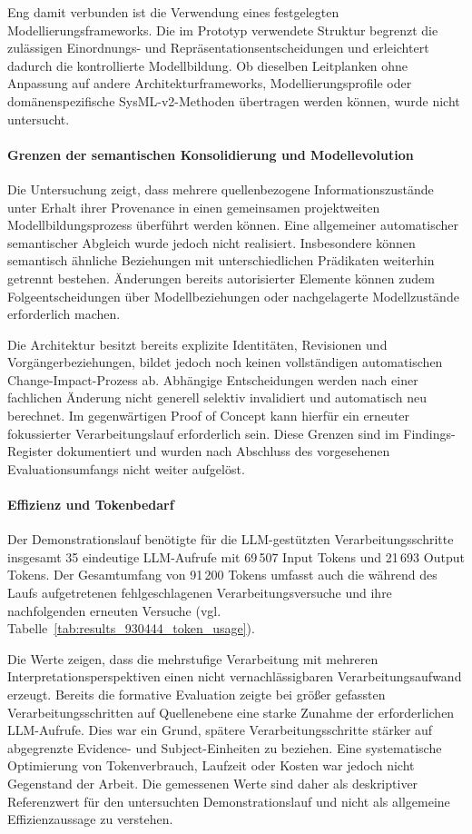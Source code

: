 Eng damit verbunden ist die Verwendung eines festgelegten
Modellierungsframeworks. Die im Prototyp verwendete Struktur begrenzt die
zulässigen Einordnungs- und Repräsentationsentscheidungen und erleichtert
dadurch die kontrollierte Modellbildung. Ob dieselben Leitplanken ohne
Anpassung auf andere Architekturframeworks, Modellierungsprofile oder
domänenspezifische SysML-v2-Methoden übertragen werden können, wurde nicht
untersucht.

\paragraph{Grenzen der semantischen Konsolidierung und Modellevolution}

Die Untersuchung zeigt, dass mehrere quellenbezogene Informationszustände
unter Erhalt ihrer Provenance in einen gemeinsamen projektweiten
Modellbildungsprozess überführt werden können. Eine allgemeiner automatischer
semantischer Abgleich wurde jedoch nicht realisiert. Insbesondere
können semantisch ähnliche Beziehungen mit unterschiedlichen Prädikaten
weiterhin getrennt bestehen. Änderungen bereits autorisierter Elemente
können zudem Folgeentscheidungen über Modellbeziehungen oder nachgelagerte
Modellzustände erforderlich machen.

Die Architektur besitzt bereits explizite Identitäten, Revisionen und
Vorgängerbeziehungen, bildet jedoch noch keinen vollständigen automatischen
Change-Impact-Prozess ab. Abhängige Entscheidungen werden nach einer
fachlichen Änderung nicht generell selektiv invalidiert und automatisch neu
berechnet. Im gegenwärtigen Proof of Concept kann hierfür ein erneuter
fokussierter Verarbeitungslauf erforderlich sein. Diese Grenzen sind im
Findings-Register dokumentiert und wurden nach Abschluss des vorgesehenen
Evaluationsumfangs nicht weiter aufgelöst.

\paragraph{Effizienz und Tokenbedarf}

Der Demonstrationslauf benötigte für die LLM-gestützten
Verarbeitungsschritte insgesamt 35 eindeutige LLM-Aufrufe mit 69\,507 Input
Tokens und 21\,693 Output Tokens. Der Gesamtumfang von 91\,200 Tokens umfasst
auch die während des Laufs aufgetretenen fehlgeschlagenen Verarbeitungsversuche
und ihre nachfolgenden erneuten Versuche
(vgl. Tabelle~\ref{tab:results_930444_token_usage}).

Die Werte zeigen, dass die mehrstufige Verarbeitung mit mehreren
Interpretationsperspektiven einen nicht vernachlässigbaren
Verarbeitungsaufwand erzeugt. Bereits die formative Evaluation zeigte bei
größer gefassten Verarbeitungsschritten auf Quellenebene eine starke Zunahme
der erforderlichen LLM-Aufrufe. Dies war ein Grund, spätere
Verarbeitungsschritte stärker auf abgegrenzte Evidence- und Subject-Einheiten
zu beziehen. Eine systematische Optimierung von Tokenverbrauch, Laufzeit oder
Kosten war jedoch nicht Gegenstand der Arbeit. Die gemessenen Werte sind daher als
deskriptiver Referenzwert für den untersuchten Demonstrationslauf und nicht als
allgemeine Effizienzaussage zu verstehen.

